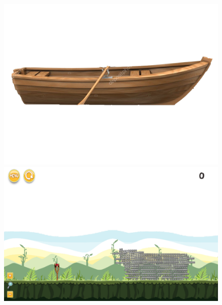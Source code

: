 \documentclass{dalthesis}
\begin{document}
\begin{figure}
  \includegraphics[width=\textwidth,height=\textheight,keepaspectratio]{levels/pictures/ships/rowboat.jpg}
  \includegraphics[width=\textwidth,height=\textheight,keepaspectratio]{levels/screenshots/ships/rowboat.png}
\end{figure}
\end{document}
